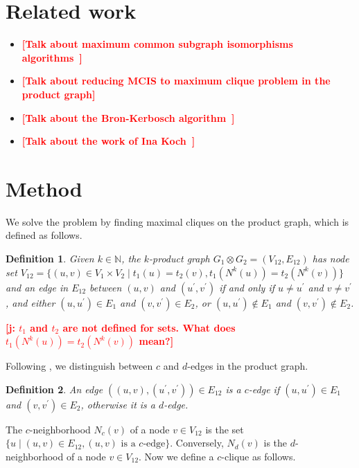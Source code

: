 \documentclass[11pt]{article}
\newcommand{\todo}[1]{\xspace{\bfseries\sffamily\textcolor{red}{[#1]}}\xspace}
\newtheorem{definition}{Definition}[section]
\begin{document}
\section{Related work}

\begin{itemize}
  \item \todo{Talk about maximum common subgraph isomorphisms
    algorithms~\cite{Raymond:2002ug}}
  \item \todo{Talk about reducing MCIS to maximum clique problem in the product
    graph}
  \item \todo{Talk about the Bron-Kerbosch algorithm~\cite{Bron:1973tk}}
  \item \todo{Talk about the work of Ina Koch~\cite{Koch:2001wi}}
\end{itemize}

\section{Method}

We solve the problem by finding maximal cliques on the product graph, which is
defined as follows.

\begin{definition}
Given $k \in \mathbb{N}$, the \emph{$k$-product graph} $G_1 \otimes G_2 =
(V_{12}, E_{12})$ has node set $V_{12} = \{(u,v) \in V_1 \times V_2 \mid t_1(u)
= t_2(v), t_1(N^k(u)) = t_2(N^k(v)) \}$ and an edge in $E_{12}$ between $(u,v)$
and $(u^\prime,v^\prime)$ if and only if $u \neq u^\prime$ and $v \neq
v^\prime$, and either $(u,u^\prime) \in E_1$ and $(v,v^\prime) \in E_2$, or
$(u,u^\prime) \not \in E_1$ and $(v,v^\prime) \not \in E_2$.
\end{definition}
\todo{j: $t_1$ and $t_2$ are not defined for sets. What does $t_1(N^k(u)) = t_2(N^k(v))$ mean?}

Following \cite{Koch:2001wi}, we distinguish between $c$ and $d$-edges in the
product graph.

\begin{definition}
An edge $((u,v),(u^\prime,v^\prime)) \in E_{12}$ is a \emph{$c$-edge} if
$(u,u^\prime) \in E_1$ and $(v,v^\prime) \in E_2$, otherwise it is a
\emph{$d$-edge}.
\end{definition}

The $c$-neighborhood $N_c(v)$ of a node $v \in V_{12}$ is the set $\{ u
\mid (u,v) \in E_{12}, (u,v) \mbox{ is a $c$-edge} \}$. Conversely, $N_d(v)$ is
the $d$-neighborhood of a node $v \in V_{12}$.
Now we define a $c$-clique as follows.
\end{document}
